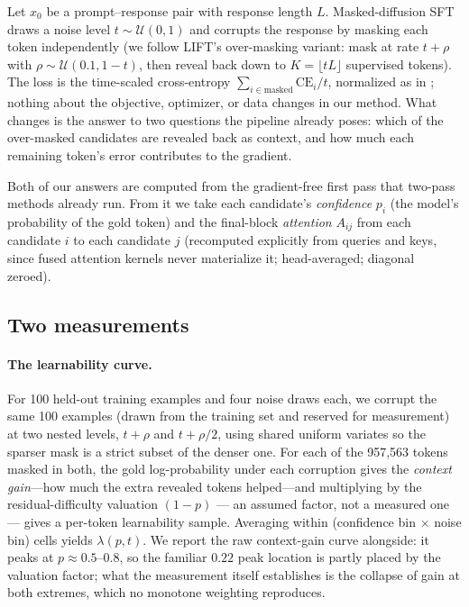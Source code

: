 \documentclass{article} %
\begin{document}
Let $x_0$ be a prompt--response pair with response length $L$. Masked-diffusion SFT draws a noise level $t \sim \mathcal{U}(0,1)$ and corrupts the response by masking each token independently (we follow LIFT's over-masking variant: mask at rate $t + \rho$ with $\rho \sim \mathcal{U}(0.1, 1{-}t)$, then reveal back down to $K = \lfloor tL \rfloor$ supervised tokens). The loss is the time-scaled cross-entropy $\sum_{i \in \text{masked}} \mathrm{CE}_i / t$, normalized as in \citet{lift2026}; nothing about the objective, optimizer, or data changes in our method. What changes is the answer to two questions the pipeline already poses: which of the over-masked candidates are revealed back as context, and how much each remaining token's error contributes to the gradient.

Both of our answers are computed from the gradient-free first pass that two-pass methods already run. From it we take each candidate's \emph{confidence} $p_i$ (the model's probability of the gold token) and the final-block \emph{attention} $A_{ij}$ from each candidate $i$ to each candidate $j$ (recomputed explicitly from queries and keys, since fused attention kernels never materialize it; head-averaged; diagonal zeroed).

\subsection{Two measurements}
\label{sec:measurements}

\paragraph{The learnability curve.} For 100 held-out training examples and four noise draws each, we corrupt the same 100 examples (drawn from the training set and reserved for measurement) at two nested levels, $t + \rho$ and $t + \rho/2$, using shared uniform variates so the sparser mask is a strict subset of the denser one. For each of the 957{,}563 tokens masked in both, the gold log-probability under each corruption gives the \emph{context gain}---how much the extra revealed tokens helped---and multiplying by the residual-difficulty valuation $(1-p)$ --- an assumed factor, not a measured one --- gives a per-token learnability sample. Averaging within (confidence bin $\times$ noise bin) cells yields $\lambda(p, t)$. We report the raw context-gain curve alongside: it peaks at $p \approx 0.5$--$0.8$, so the familiar $0.22$ peak location is partly placed by the valuation factor; what the measurement itself establishes is the collapse of gain at both extremes, which no monotone weighting reproduces.
\end{document}
